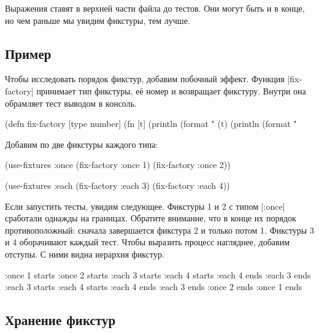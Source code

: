 Выражения ставят в верхней части файла до тестов. Они могут быть и в конце, но
чем раньше мы увидим фикстуры, тем лучше.

\subsection{Пример}

Чтобы исследовать порядок фикстур, добавим побочный эффект. Функция
\spverb|fix-factory| принимает тип фикстуры, е\"{е} номер и возвращает
фикстуру. Внутри она обрамляет тест выводом в консоль.


\begin{english}
  \begin{clojure}
(defn fix-factory [type number]
  (fn [t]
    (println (format "%
    (t)
    (println (format "%
  \end{clojure}
\end{english}

\noindent
Добавим по две фикстуры каждого типа:

\begin{english}
  \begin{clojure}
(use-fixtures :once
  (fix-factory :once 1)
  (fix-factory :once 2))

(use-fixtures :each
  (fix-factory :each 3)
  (fix-factory :each 4))
  \end{clojure}
\end{english}

Если запустить тесты, увидим следующее. Фикстуры 1 и 2 с типом \spverb|:once|
сработали однажды на границах. Обратите внимание, что в конце их порядок
противоположный: сначала завершается фикстура 2 и только потом 1. Фикстуры 3 и 4
оборачивают каждый тест. Чтобы выразить процесс нагляднее, добавим отступы. С
ними видна иерархия фикстур.


\begin{english}
  \begin{clojure}
:once 1 starts
  :once 2 starts
    :each 3 starts
      :each 4 starts
      :each 4 ends
    :each 3 ends
    :each 3 starts
      :each 4 starts
      :each 4 ends
    :each 3 ends
  :once 2 ends
:once 1 ends
  \end{clojure}
\end{english}

\subsection{Хранение фикстур}

